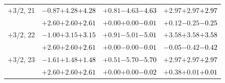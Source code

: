 \documentclass[compress]{beamer}
\begin{document}
\begin{frame}
\begin{tabular}{r | c | c | c}
$+$3/2, 21 & $-0.87$\hspace{0.1 cm}$+4.28$\hspace{0.1 cm}\textcolor{black}{$+4.28$} & $+0.81$\hspace{0.1 cm}$-4.63$\hspace{0.1 cm}\textcolor{black}{$-4.63$} & $+2.97$\hspace{0.1 cm}$+2.97$\hspace{0.1 cm}\textcolor{black}{$+2.97$} \\
           & $+2.60$\hspace{0.1 cm}$+2.60$\hspace{0.1 cm}\textcolor{black}{$+2.61$} & $+0.00$\hspace{0.1 cm}$+0.00$\hspace{0.1 cm}\textcolor{black}{$-0.01$} & $+0.12$\hspace{0.1 cm}$-0.25$\hspace{0.1 cm}\textcolor{black}{$-0.25$} \\
$+$3/2, 22 & $-1.00$\hspace{0.1 cm}$+3.15$\hspace{0.1 cm}\textcolor{black}{$+3.15$} & $+0.91$\hspace{0.1 cm}$-5.01$\hspace{0.1 cm}\textcolor{black}{$-5.01$} & $+3.58$\hspace{0.1 cm}$+3.58$\hspace{0.1 cm}\textcolor{black}{$+3.58$} \\
           & $+2.60$\hspace{0.1 cm}$+2.60$\hspace{0.1 cm}\textcolor{black}{$+2.61$} & $+0.00$\hspace{0.1 cm}$-0.00$\hspace{0.1 cm}\textcolor{black}{$-0.01$} & $-0.05$\hspace{0.1 cm}$-0.42$\hspace{0.1 cm}\textcolor{black}{$-0.42$} \\
$+$3/2, 23 & $-1.61$\hspace{0.1 cm}$+1.48$\hspace{0.1 cm}\textcolor{black}{$+1.48$} & $+0.51$\hspace{0.1 cm}$-5.70$\hspace{0.1 cm}\textcolor{black}{$-5.70$} & $+2.97$\hspace{0.1 cm}$+2.97$\hspace{0.1 cm}\textcolor{black}{$+2.97$} \\
           & $+2.60$\hspace{0.1 cm}$+2.60$\hspace{0.1 cm}\textcolor{black}{$+2.61$} & $+0.00$\hspace{0.1 cm}$+0.00$\hspace{0.1 cm}\textcolor{black}{$-0.02$} & $+0.38$\hspace{0.1 cm}$+0.01$\hspace{0.1 cm}\textcolor{black}{$+0.01$} \\

\end{tabular}
\end{frame}
\end{document}

